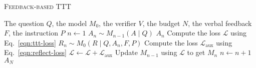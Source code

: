 \begin{algorithm}[t!]
    \caption{\textsc{Feedback-based TTT}}
    \label{alg:ttt}
    \begin{algorithmic}[1]
        \Require The question $Q$, the model $M_0$, the verifier $V$, the budget $N$, the verbal feedback $F$, the instruction $P$
        \State $n \leftarrow 1$
            \State $A_n\sim M_{n-1}\left(A\mid Q\right)$ %
                \State \Return $A_n$
            \Else
                \State Compute the loss $\mathcal{L}$ using Eq.~\ref{eqn:ttt-loss} 
                    \State $R_n\sim M_0\left(R\mid Q,A_n,F,P\right)$
                    \State Compute the loss $\mathcal{L}_\mathrm{aux}$ using Eq.~\ref{eqn:reflect-loss} 
                    \State $\mathcal{L} \leftarrow \mathcal{L} + \mathcal{L}_\mathrm{aux}$
                \EndIf
                \State Update $M_{n-1}$ using $\mathcal{L}$ to get $M_{n}$
            \EndIf
            \State $n \leftarrow n + 1$
        \EndWhile
        \State \Return $A_{N}$
    \end{algorithmic}
\end{algorithm}